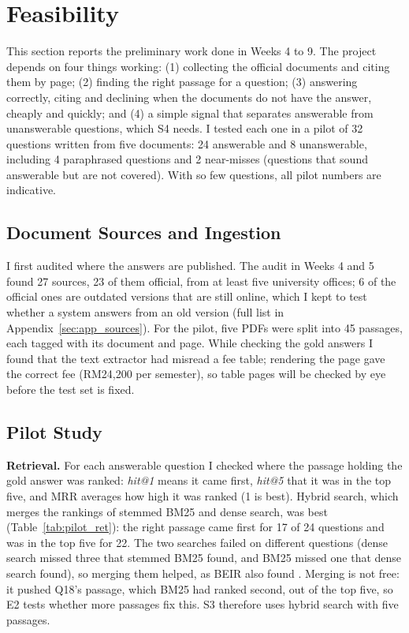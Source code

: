\documentclass[12pt,nonacm,acmlarge,titlepage,screen]{acmart}
\begin{document}
\section{Feasibility} \label{cha:feas}

This section reports the preliminary work done in Weeks 4 to 9. The project depends on four things working: (1) collecting the official documents and citing them by page; (2) finding the right passage for a question; (3) answering correctly, citing and declining when the documents do not have the answer, cheaply and quickly; and (4) a simple signal that separates answerable from unanswerable questions, which S4 needs. I tested each one in a pilot of 32 questions written from five documents: 24 answerable and 8 unanswerable, including 4 paraphrased questions and 2 near-misses (questions that sound answerable but are not covered). With so few questions, all pilot numbers are indicative.

\subsection{Document Sources and Ingestion} \label{sec:feas_docs}

I first audited where the answers are published. The audit in Weeks 4 and 5 found 27 sources, 23 of them official, from at least five university offices; 6 of the official ones are outdated versions that are still online, which I kept to test whether a system answers from an old version (full list in Appendix~\ref{sec:app_sources}). For the pilot, five PDFs were split into 45 passages, each tagged with its document and page. While checking the gold answers I found that the text extractor had misread a fee table; rendering the page gave the correct fee (RM24,200 per semester), so table pages will be checked by eye before the test set is fixed.

\subsection{Pilot Study} \label{sec:feas_pilot}

\textbf{Retrieval.} For each answerable question I checked where the passage holding the gold answer was ranked: \emph{hit@1} means it came first, \emph{hit@5} that it was in the top five, and MRR averages how high it was ranked (1 is best). Hybrid search, which merges the rankings of stemmed BM25 and dense search, was best (Table~\ref{tab:pilot_ret}): the right passage came first for 17 of 24 questions and was in the top five for 22. The two searches failed on different questions (dense search missed three that stemmed BM25 found, and BM25 missed one that dense search found), so merging them helped, as BEIR also found \cite{thakur2021beir}. Merging is not free: it pushed Q18's passage, which BM25 had ranked second, out of the top five, so E2 tests whether more passages fix this. S3 therefore uses hybrid search with five passages.
\end{document}
